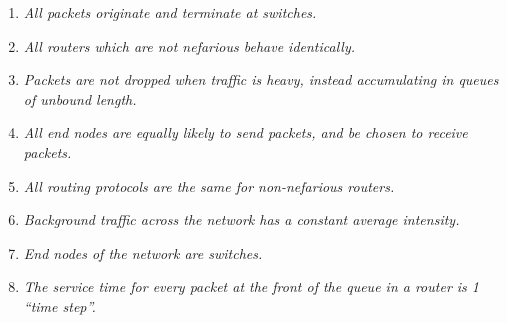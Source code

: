 \begin{enumerate}
\item \emph{All packets originate and terminate at switches.}
\item \emph{All routers which are not nefarious behave identically.}
\item \emph{Packets are not dropped when traffic is heavy, instead accumulating in queues of unbound length.}
\item \emph{All end nodes are equally likely to send packets, and be chosen to receive packets.}
\item \emph{All routing protocols are the same for non-nefarious routers.}
\item \emph{Background traffic across the network has a constant average intensity.}
\item \emph{End nodes of the network are switches.}
\item \emph{The service time for every packet at the front of the queue in a router is 1 “time step”.}
\end{enumerate}

